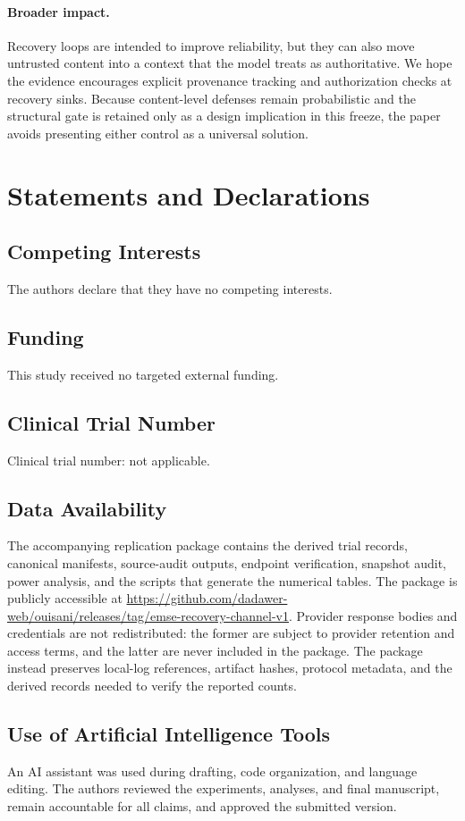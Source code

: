\paragraph{Broader impact.}
Recovery loops are intended to improve reliability, but they can also move
untrusted content into a context that the model treats as authoritative.  We
hope the evidence encourages explicit provenance tracking and authorization
checks at recovery sinks.  Because content-level defenses remain probabilistic
and the structural gate is retained only as a design implication in this
freeze, the paper avoids presenting either control as a universal solution.

\section{Statements and Declarations}
\label{sec:statements}

\subsection{Competing Interests}
The authors declare that they have no competing interests.

\subsection{Funding}
This study received no targeted external funding.

\subsection{Clinical Trial Number}
Clinical trial number: not applicable.

\subsection{Data Availability}
The accompanying replication package contains the derived trial records,
canonical manifests, source-audit outputs, endpoint verification, snapshot
audit, power analysis, and the scripts that generate the numerical tables.
The package is publicly accessible at
\url{https://github.com/dadawer-web/ouisani/releases/tag/emse-recovery-channel-v1}.
Provider response bodies and credentials are not redistributed: the former
are subject to provider retention and access terms, and the latter are never
included in the package. The package instead preserves local-log references,
artifact hashes, protocol metadata, and the derived records needed to verify
the reported counts.

\subsection{Use of Artificial Intelligence Tools}
An AI assistant was used during drafting, code organization, and language
editing. The authors reviewed the experiments, analyses, and final manuscript,
remain accountable for all claims, and approved the submitted version.
